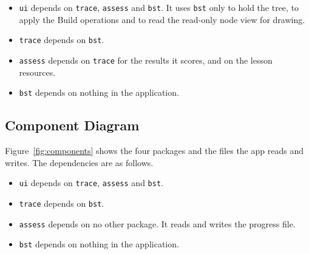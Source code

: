 \begin{itemize}
    \item \texttt{ui} depends on \texttt{trace}, \texttt{assess} and \texttt{bst}. It uses \texttt{bst} only to hold the tree, to apply the Build operations and to read the read-only node view for drawing.
    \item \texttt{trace} depends on \texttt{bst}.
    \item \texttt{assess} depends on \texttt{trace} for the results it scores, and on the lesson resources.
    \item \texttt{bst} depends on nothing in the application.
\end{itemize}

\subsection{Component Diagram}
Figure~\ref{fig:components} shows the four packages and the files the app reads and writes. The dependencies are as follows.

\begin{itemize}
    \item \texttt{ui} depends on \texttt{trace}, \texttt{assess} and \texttt{bst}.
    \item \texttt{trace} depends on \texttt{bst}.
    \item \texttt{assess} depends on no other package. It reads and writes the progress file.
    \item \texttt{bst} depends on nothing in the application.
\end{itemize}

